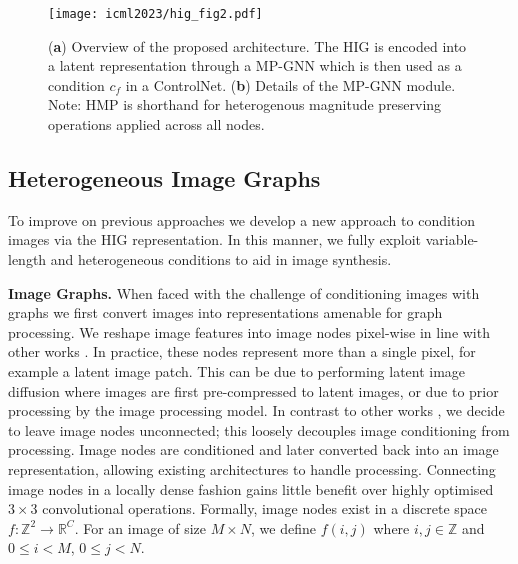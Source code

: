 \begin{figure}
    \centering    \texttt{[image: icml2023/hig\_fig2.pdf]}
\vspace{-20pt}
    \caption{(\textbf{a}) Overview of the proposed architecture. The HIG is encoded into a latent representation through a MP-GNN which is then used as a condition $c_f$ in a ControlNet. (\textbf{b}) Details of the MP-GNN module. Note: HMP is shorthand for heterogenous magnitude preserving operations applied across all nodes.}
    \label{fig:architecture}
\end{figure}

\subsection{Heterogeneous Image Graphs}

To improve on previous approaches we develop a new approach to condition images via the HIG representation. In this manner, we fully exploit variable-length and heterogeneous conditions to aid in image synthesis.

\textbf{Image Graphs.} When faced with the challenge of conditioning images with graphs we first convert images into representations amenable for graph processing. We reshape image features into image nodes pixel-wise in line with other works \cite{liu_cnn-enhanced_2021, han_vision_2022}. In practice, these nodes represent more than a single pixel, for example a latent image patch. This can be due to performing latent image diffusion \cite{rombach_high-resolution_2022, podell_sdxl_2023} where images are first pre-compressed to latent images, or due to prior processing by the image processing model. In contrast to other works \cite{tian_image_nodate, han_vision_2022, tarasiewicz_graph_2021}, we decide to leave image nodes unconnected; this loosely decouples image conditioning from processing. Image nodes are conditioned and later converted back into an image representation, allowing existing architectures to handle processing. Connecting image nodes in a locally dense fashion gains little benefit over highly optimised $3 \times 3$ convolutional operations. Formally, image nodes exist in a discrete space \( f : \mathbb{Z}^2 \to \mathbb{R}^C \). For an image of size \(M \times N\), we define \( f(i, j) \) where \( i, j \in \mathbb{Z} \) and \( 0 \leq i < M \), \( 0 \leq j < N \).

